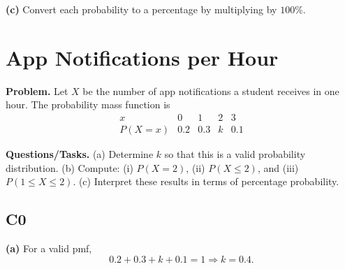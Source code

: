 		\textbf{(c)} Convert each probability to a percentage by multiplying by $100\%$.
		
		\section{App Notifications per Hour}
		
		\textbf{Problem.}
		Let $X$ be the number of app notifications a student receives in one hour. The probability mass function is
		\[
		\begin{array}{c|cccc}
			x & 0 & 1 & 2 & 3\\
			\hline
			P(X=x) & 0.2 & 0.3 & k & 0.1
		\end{array}
		\]
		
		\textbf{Questions/Tasks.}
		(a) Determine $k$ so that this is a valid probability distribution.
		(b) Compute: (i) $P(X=2)$, (ii) $P(X\le 2)$, and (iii) $P(1\le X\le 2)$.
		(c) Interpret these results in terms of percentage probability.
		
		\subsection*{C0}

		\textbf{(a)} For a valid pmf,
		\[
		0.2+0.3+k+0.1=1\Rightarrow k=0.4.
		\]

